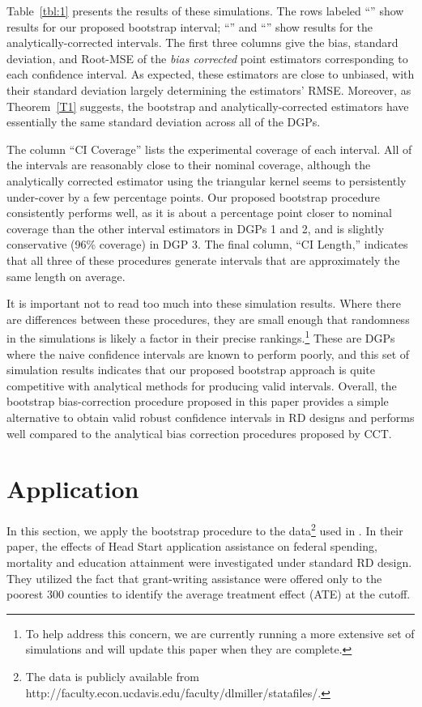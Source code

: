 \documentclass[12pt,fleqn]{article}
\begin{document}
Table~\ref{tbl:1} presents the results of these simulations. The rows labeled
``\bootuni'' show results for our proposed bootstrap interval; ``\cctuni'' and
``\ccttri'' show results for the analytically-corrected intervals. The first
three columns give the bias, standard deviation, and Root-MSE of the \emph{bias corrected} point
estimators corresponding to each confidence interval.  As expected, these
estimators are close to unbiased, with their standard deviation largely
determining the estimators' RMSE. Moreover, as Theorem~\ref{T1} suggests, the
bootstrap and analytically-corrected estimators have essentially the same
standard deviation across all of the DGPs.

The column ``CI Coverage'' lists the experimental coverage of each interval.
All of the intervals are reasonably close to their nominal coverage, although
the analytically corrected estimator using the triangular kernel seems to
persistently under-cover by a few percentage points. Our proposed bootstrap
procedure consistently performs well, as it is about a percentage point closer
to nominal coverage than the other interval estimators in DGPs 1 and 2, and is
slightly conservative (96\% coverage) in DGP 3. The final column, ``CI Length,''
indicates that all three of these procedures generate intervals that are
approximately the same length on average.

It is important not to read too much into these simulation results. Where there
are differences between these procedures, they are small enough that randomness
in the simulations is likely a factor in their precise rankings.\footnote{%
  To help address this concern, we are currently running a more extensive set of
  simulations and will update this paper when they are complete.} %
These are DGPs where the naive confidence intervals are known to perform poorly,
and this set of simulation results indicates that our proposed bootstrap approach
is quite competitive with analytical methods for producing valid intervals.
Overall, the bootstrap bias-correction procedure proposed in this paper provides
a simple alternative to obtain valid robust confidence intervals in RD designs
and performs well compared to the analytical bias correction procedures proposed
by CCT.

\section{Application}\label{application}

In this section, we apply the bootstrap procedure to the data\footnote{The data is publicly available from http://faculty.econ.ucdavis.edu/faculty/dlmiller/statafiles/.} used in \cite{ludwig2007}. In their paper, the effects of Head Start application assistance on federal spending, mortality and education attainment were investigated under standard RD design. They utilized the fact that grant-writing assistance were offered only to the poorest 300 counties to identify the average treatment effect (ATE) at the cutoff.
\end{document}
